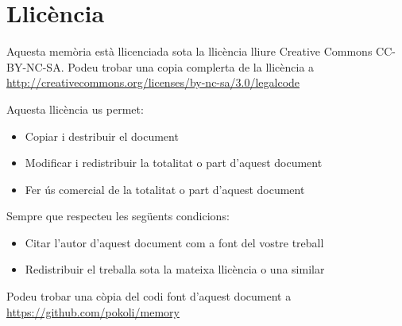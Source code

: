 \chapter*{Llicència}

Aquesta memòria està llicenciada sota la llicència lliure Creative Commons CC-BY-NC-SA. Podeu trobar una copia complerta de la llicència a \url{http://creativecommons.org/licenses/by-nc-sa/3.0/legalcode}

Aquesta llicència us permet: 

\begin{itemize}
    \item{Copiar i destribuir el document}
    \item{Modificar i redistribuir la totalitat o part d'aquest document}
    \item{Fer ús comercial de la totalitat o part d'aquest document} 
\end{itemize}

Sempre que respecteu les següents condicions: 

\begin{itemize}
    \item{Citar l'autor d'aquest document com a font del vostre treball}
    \item{Redistribuir el treballa sota la mateixa llicència o una similar}
\end{itemize}

Podeu trobar una còpia del codi font d'aquest document a \url{https://github.com/pokoli/memory}

